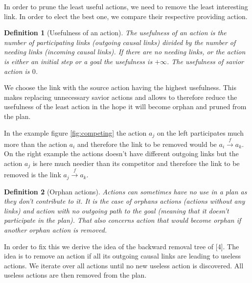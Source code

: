 \documentclass[]{article}
\newtheorem{definition}{Definition}
\begin{document}
In order to prune the least useful actions, we need to remove the least
interesting link. In order to elect the best one, we compare their
respective providing action.

\begin{definition}[Usefulness of an action]

The usefulness of an action is the number of participating links
(outgoing causal links) divided by the number of needing links (incoming
causal links). If there are no needing links, or the action is either an
initial step or a goal the usefulness is \(+\infty\). The usefulness of
savior action is \(0\).

\end{definition}

We choose the link with the source action having the highest usefulness.
This makes replacing unnecessary savior actions and allows to therefore
reduce the usefulness of the least action in the hope it will become
orphan and pruned from the plan.

In the example figure \ref{fig:competing} the action \(a_j\) on the left
participates much more than the action \(a_i\) and therefore the link to
be removed would be \(a_i \xrightarrow{f} a_k\). On the right example
the actions doesn't have different outgoing links but the action \(a_j\)
is here much needier than its competitor and therefore the link to be
removed is the link \(a_j \xrightarrow{f} a_k\).

\begin{definition}[Orphan actions]

Actions can sometimes have no use in a plan as they don't contribute to
it. It is the case of orphans actions (actions without any links) and
action with no outgoing path to the goal (meaning that it doesn't
participate in the plan). That also concerns action that would become
orphan if another orphan action is removed.

\end{definition}

In order to fix this we derive the idea of the backward removal tree of
{[}4{]}. The idea is to remove an action if all its outgoing causal
links are leading to useless actions. We iterate over all actions until
no new useless action is discovered. All useless actions are then
removed from the plan.
\end{document}
